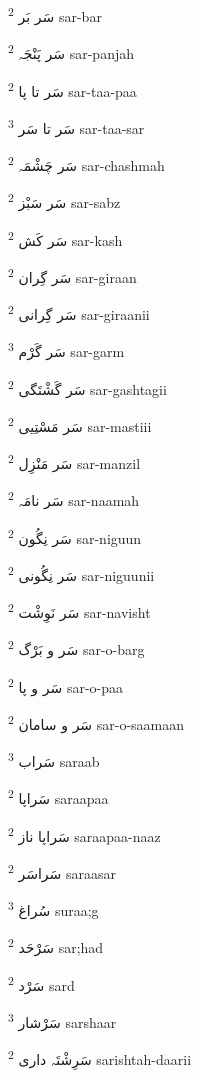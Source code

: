 \documentclass[12pt]{article}
\begin{document}
\begin{multicols}{5}
{\ur سَر بَر}   \textsuperscript{2} sar-bar

{\ur سَر پَنْجَہ}   \textsuperscript{2} sar-panjah

{\ur سَر تا پا}   \textsuperscript{2} sar-taa-paa

{\ur سَر تا سَر}   \textsuperscript{3} sar-taa-sar

{\ur سَر چَشْمَہ}   \textsuperscript{2} sar-chashmah

{\ur سَر سَبْز}   \textsuperscript{2} sar-sabz

{\ur سَر کَش}   \textsuperscript{2} sar-kash

{\ur سَر گِران}   \textsuperscript{2} sar-giraan

{\ur سَر گِرانی}   \textsuperscript{2} sar-giraanii

{\ur سَر گَرْم}   \textsuperscript{3} sar-garm

{\ur سَر گَشْتَگی}   \textsuperscript{2} sar-gashtagii

{\ur سَر مَسْتِیی}   \textsuperscript{2} sar-mastiii

{\ur سَر مَنْزِل}   \textsuperscript{2} sar-manzil

{\ur سَر نامَہ}   \textsuperscript{2} sar-naamah

{\ur سَر نِگُون}   \textsuperscript{2} sar-niguun

{\ur سَر نِگُونی}   \textsuperscript{2} sar-niguunii

{\ur سَر نَوِشْت}   \textsuperscript{2} sar-navisht

{\ur سَر و بَرْگ}   \textsuperscript{2} sar-o-barg

{\ur سَر و پا}   \textsuperscript{2} sar-o-paa

{\ur سَر و سامان}   \textsuperscript{2} sar-o-saamaan

{\ur سَراب}   \textsuperscript{3} saraab

{\ur سَراپا}   \textsuperscript{2} saraapaa

{\ur سَراپا ناز}   \textsuperscript{2} saraapaa-naaz

{\ur سَراسَر}   \textsuperscript{2} saraasar

{\ur سُراغ}   \textsuperscript{3} suraa;g

{\ur سَرْحَد}   \textsuperscript{2} sar;had

{\ur سَرْد}   \textsuperscript{2} sard

{\ur سَرْشار}   \textsuperscript{3} sarshaar

{\ur سَرِشْتَہ داری}   \textsuperscript{2} sarishtah-daarii


\end{multicols}
\end{document}
